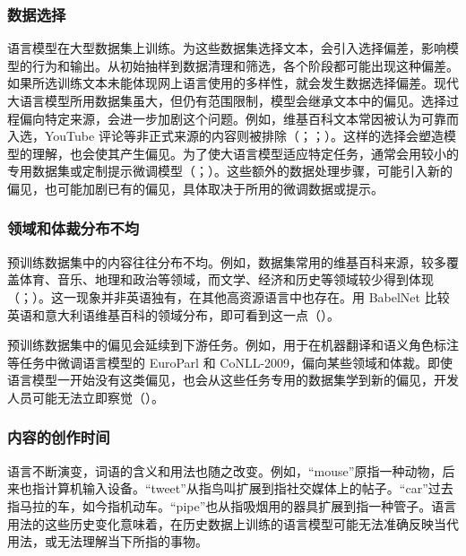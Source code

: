 \subsubsection{数据选择}
语言模型在大型数据集上训练。为这些数据集选择文本，会引入选择偏差，影响模型的行为和输出。从初始抽样到数据清理和筛选，各个阶段都可能出现这种偏差。如果所选训练文本未能体现网上语言使用的多样性，就会发生数据选择偏差。现代大语言模型所用数据集虽大，但仍有范围限制，模型会继承文本中的偏见。选择过程偏向特定来源，会进一步加剧这个问题。例如，维基百科文本常因被认为可靠而入选，YouTube 评论等非正式来源的内容则被排除（；；）。这样的选择会塑造模型的理解，也会使其产生偏见。为了使大语言模型适应特定任务，通常会用较小的专用数据集或定制提示微调模型（；）。这些额外的数据处理步骤，可能引入新的偏见，也可能加剧已有的偏见，具体取决于所用的微调数据或提示。

\subsubsection{领域和体裁分布不均}
预训练数据集中的内容往往分布不均。例如，数据集常用的维基百科来源，较多覆盖体育、音乐、地理和政治等领域，而文学、经济和历史等领域较少得到体现（；）。这一现象并非英语独有，在其他高资源语言中也存在。用 BabelNet 比较英语和意大利语维基百科的领域分布，即可看到这一点（）。

预训练数据集中的偏见会延续到下游任务。例如，用于在机器翻译和语义角色标注等任务中微调语言模型的 EuroParl 和 CoNLL-2009，偏向某些领域和体裁。即使语言模型一开始没有这类偏见，也会从这些任务专用的数据集学到新的偏见，开发人员可能无法立即察觉（）。

\subsubsection{内容的创作时间}
语言不断演变，词语的含义和用法也随之改变。例如，“mouse”原指一种动物，后来也指计算机输入设备。“tweet”从指鸟叫扩展到指社交媒体上的帖子。“car”过去指马拉的车，如今指机动车。“pipe”也从指吸烟用的器具扩展到指一种管子。语言用法的这些历史变化意味着，在历史数据上训练的语言模型可能无法准确反映当代用法，或无法理解当下所指的事物。


